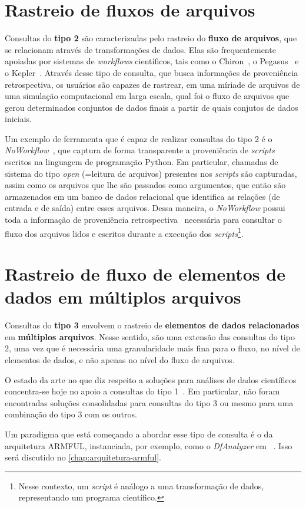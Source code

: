 \section{Rastreio de fluxos de arquivos}%
\label{sec:rastreio-de-fluxos-de-arquivos}

Consultas do \textbf{tipo 2} são caracterizadas pelo rastreio do \textbf{fluxo de arquivos}, que se relacionam através de transformações de dados. Elas são frequentemente apoiadas por sistemas de \textit{workflows} científicos, tais como o Chiron~\cite{ogasawara2011algebraic}, o Pegasus~\cite{deelman2005pegasus} e o Kepler~\cite{ludascher2006scientific}. Através desse tipo de consulta, que busca informações de proveniência retrospectiva, os usuários são capazes de rastrear, em uma míriade de arquivos de uma simulação computacional em larga escala, qual foi o fluxo de arquivos que gerou determinados conjuntos de dados finais a partir de quais conjutos de dados iniciais.

Um exemplo de ferramenta que é capaz de realizar consultas do tipo 2 é o \textit{NoWorkflow}~\cite{murta2014noworkflow}, que captura de forma transparente a proveniência de \textit{scripts} escritos na linguagem de programação Python. Em particular, chamadas de sistema do tipo \emph{open} (=leitura de arquivos) presentes nos \textit{scripts} são capturadas, assim como os arquivos que lhe são passados como argumentos, que então são armazenados em um banco de dados relacional que identifica as relações (de entrada e de saída) entre esses arquivos. Dessa maneira, o \textit{NoWorkflow} possui toda a informação de proveniência retrospectiva~\cite{Pimentel2016} necessária para consultar o fluxo dos arquivos lidos e escritos durante a execução dos \textit{scripts}\footnote{Nesse contexto, um \textit{script} é análogo a uma transformação de dados, representando um programa científico.}.

\section{Rastreio de fluxo de elementos de dados em múltiplos arquivos}%
\label{sec:rastreio-de-elemento-de-dados-em-multiplos-arquivos}

Consultas do \textbf{tipo 3} envolvem o rastreio de \textbf{elementos de dados relacionados} em \textbf{múltiplos arquivos}. Nesse sentido, são uma extensão das consultas do tipo 2, uma vez que é necessária uma granularidade mais fina para o fluxo, no nível de elementos de dados, e não apenas no nível do fluxo de arquivos.

O estado da arte no que diz respeito a soluções para análises de dados científicos concentra-se hoje no apoio a consultas do tipo 1~\cite{alagiannis2012nodb,karpathiotakis2014adaptive,silva2015propostadoutorado}. Em particular, não foram encontradas soluções consolidadas para consultas do tipo 3 ou mesmo para uma combinação do tipo 3 com os outros.

Um paradigma que está começando a abordar esse tipo de consulta é o da arquitetura ARMFUL, instanciada, por exemplo, como o \textit{DfAnalyzer} em ~\cite{silva2017raw}. Isso será discutido no \autoref{chap:arquitetura-armful}.

